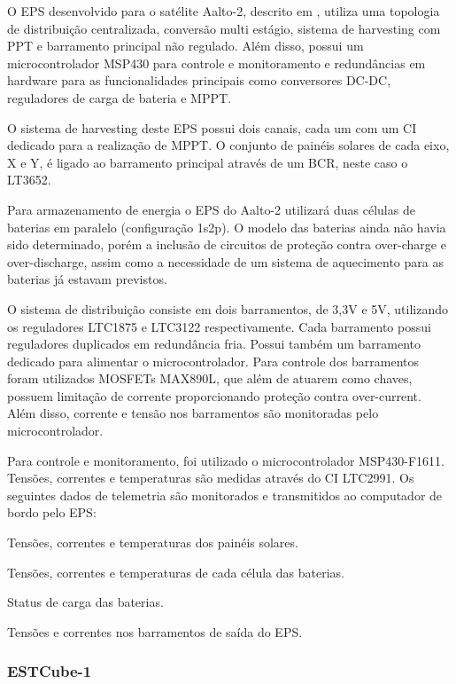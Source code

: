 O \gls{EPS} desenvolvido para o satélite Aalto-2, descrito em \textcite{aalto-eps}, utiliza uma topologia de distribuição centralizada, conversão multi estágio, sistema de harvesting com \gls{PPT} e barramento principal não regulado.
Além disso, possui um microcontrolador MSP430 para controle e monitoramento e redundâncias em hardware para as funcionalidades principais como conversores DC-DC, reguladores de carga de bateria e \gls{MPPT}.

O sistema de harvesting deste \gls{EPS} possui dois canais, cada um com um \gls{CI} dedicado para a realização de \gls{MPPT}. O conjunto de painéis solares de cada eixo, X e Y, é ligado ao barramento principal através de um \gls{BCR}, neste caso o LT3652.

Para armazenamento de energia o EPS do Aalto-2 utilizará duas células de baterias em paralelo (configuração 1s2p). O modelo das baterias ainda não havia sido determinado, porém a inclusão de circuitos de proteção contra over-charge e over-discharge, assim como a necessidade de um sistema de aquecimento para as baterias já estavam previstos.

O sistema de distribuição consiste em dois barramentos, de 3,3V e 5V, utilizando os reguladores LTC1875 e LTC3122 respectivamente.
Cada barramento possui reguladores duplicados em redundância fria.
Possui também um barramento dedicado para alimentar o microcontrolador.
Para controle dos barramentos foram utilizados MOSFETs MAX890L, que além de atuarem como chaves, possuem limitação de corrente proporcionando proteção contra over-current.
Além disso, corrente e tensão nos barramentos são monitoradas pelo microcontrolador.

Para controle e monitoramento, foi utilizado o microcontrolador MSP430-F1611. Tensões, correntes e temperaturas são medidas através do \gls{CI} LTC2991. Os seguintes dados de telemetria são monitorados e transmitidos ao computador de bordo pelo EPS:
\begin{alineas}
    \item Tensões, correntes e temperaturas dos painéis solares.
    \item Tensões, correntes e temperaturas de cada célula das baterias.
    \item Status de carga das baterias.
    \item Tensões e correntes nos barramentos de saída do EPS.
\end{alineas}


\subsubsection{ESTCube-1}

